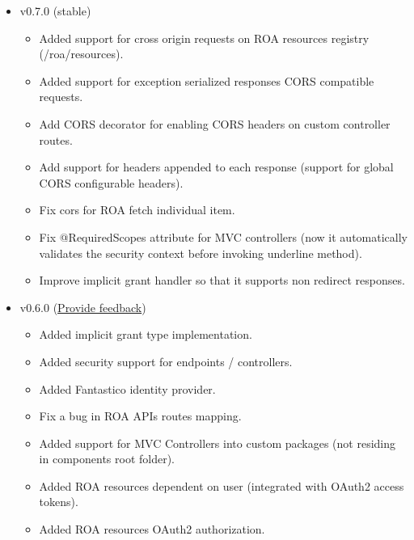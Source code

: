 \documentclass[letterpaper,10pt,english]{sphinxmanual}
\begin{document}
\begin{itemize}
\item {} 
v0.7.0 (stable)
\begin{itemize}
\item {} 
Added support for cross origin requests on ROA resources registry (/roa/resources).

\item {} 
Added support for exception serialized responses CORS compatible requests.

\item {} 
Add CORS decorator for enabling CORS headers on custom controller routes.

\item {} 
Add support for headers appended to each response (support for global CORS configurable headers).

\item {} 
Fix cors for ROA fetch individual item.

\item {} 
Fix @RequiredScopes attribute for MVC controllers (now it automatically validates the security context before invoking underline method).

\item {} 
Improve implicit grant handler so that it supports non redirect responses.

\end{itemize}

\item {} 
v0.6.0 (\href{https://docs.google.com/forms/d/1tKBopU3lfDB\_w8F4h7Rl1Rn4uydAJq-nha09L\_ptJck/edit?usp=sharing}{Provide feedback})
\begin{itemize}
\item {} 
Added implicit grant type implementation.

\item {} 
Added security support for endpoints / controllers.

\item {} 
Added Fantastico identity provider.

\item {} 
Fix a bug in ROA APIs routes mapping.

\item {} 
Added support for MVC Controllers into custom packages (not residing in components root folder).

\item {} 
Added ROA resources dependent on user (integrated with OAuth2 access tokens).

\item {} 
Added ROA resources OAuth2 authorization.


\end{itemize}
\end{itemize}
\end{document}
